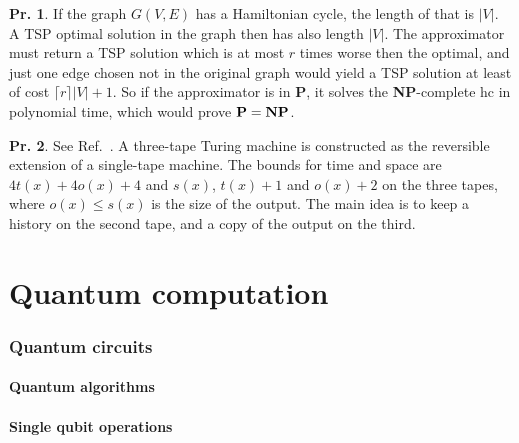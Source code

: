 \documentclass[a4paper,12pt]{article}
\theoremstyle{definition}
\newtheorem{problem}{Pr.}[section]
\begin{document}
\begin{problem}
 If the graph $G(V, E)$ has a Hamiltonian cycle, the length of that is $|V|$. A TSP optimal solution in the graph then has also length $|V|$. The approximator must return a TSP solution  which is at most $r$ times worse then the optimal, and just one edge chosen not in the original graph would yield a TSP solution at least of cost $\lceil r \rceil |V| + 1$. So if the approximator is in {\bf P}, it solves the {\bf NP}-complete {\sc hc} in polynomial time, which would prove ${\bf P} = {\bf NP}$.
\end{problem}

\begin{problem}
 See Ref.\ \cite{bennett}. A three-tape Turing machine is constructed as the reversible extension of a single-tape machine. The bounds for time and space are $4t(x) + 4 o(x)+4$ and $s(x)$, $t(x)+1$ and $o(x)+2$ on the three tapes, where $o(x)\le s(x)$ is the size of the output. The main idea is to keep a history on the second tape, and a copy of the output on the third.
\end{problem}

\part{Quantum computation}\label{pt:quantumComputation}
\section{Quantum circuits}\label{sec:quantumCircuits}
\subsection{Quantum algorithms}\label{ssec:quantumAlgorithms}
\subsection{Single qubit operations}\label{ssec:singleQubitOperatios}
\end{document}
